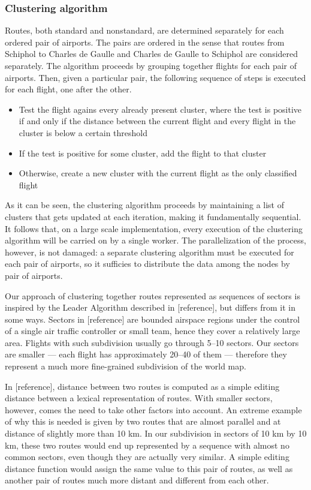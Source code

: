 \documentclass{vldb}
\begin{document}
\subsubsection{Clustering algorithm}

Routes, both standard and nonstandard, are determined separately for each
ordered pair of airports. The pairs are ordered in the sense that routes from
Schiphol to Charles de Gaulle and Charles de Gaulle to Schiphol are considered
separately. The algorithm proceeds by grouping together flights for each pair of
airports. Then, given a particular pair, the following sequence of steps is
executed for each flight, one after the other.

\begin{itemize}
  \item Test the flight agains every already present cluster, where the test is
  positive if and only if the distance between the current flight and every
  flight in the cluster is below a certain threshold
  \item If the test is positive for some cluster, add the flight to that cluster
  \item Otherwise, create a new cluster with the current flight as the only
  classified flight
\end{itemize}

As it can be seen, the clustering algorithm proceeds by maintaining a list of
clusters that gets updated at each iteration, making it fundamentally
sequential. It follows that, on a large scale implementation, every execution of
the clustering algorithm will be carried on by a single worker. The
parallelization of the process, however, is not damaged: a separate clustering
algorithm must be executed for each pair of airports, so it sufficies to
distribute the data among the nodes by pair of airports.

Our approach of clustering together routes represented as sequences of sectors
is inspired by the Leader Algorithm described in [reference], but differs from
it in some ways. Sectors in [reference] are bounded airspace regions under the
control of a single air traffic controller or small team, hence they cover a
relatively large area. Flights with such subdivision usually go through 5--10
sectors. Our sectors are smaller --- each flight has approximately 20--40 of
them --- therefore they represent a much more fine-grained subdivision of the
world map.

In [reference], distance between two routes is computed as a simple editing
distance between a lexical representation of routes. With smaller sectors,
however, comes the need to take other factors into account. An extreme example
of why this is needed is given by two routes that are almost parallel and at
distance of slightly more than 10 km. In our subdivision in sectors of 10 km by
10 km, these two routes would end up represented by a sequence with almost no
common sectors, even though they are actually very similar. A simple editing
distance function would assign the same value to this pair of routes, as well as
another pair of routes much more distant and different from each other.
\end{document}
